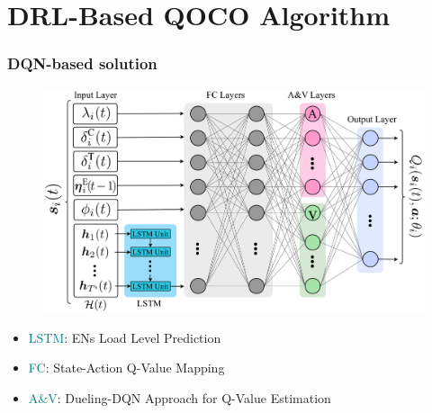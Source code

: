 \section{DRL-Based QOCO Algorithm}

\begin{frame}
	\frametitle{DQN-based solution}
	
	\begin{figure}
	\captionsetup{name=Fig.}
	\centering
	\includegraphics[width=0.85\linewidth]{DQN}
	\vspace*{-5mm}
	\vspace*{-3mm}
	\label{fig1}
\end{figure}
	
	\vspace{6mm}
	
	\begin{itemize}[]
	
	\item  \hspace{0mm}  \textcolor{teal}{LSTM}: ENs Load Level Prediction
	
	\item  \hspace{0mm}  \textcolor{teal}{FC}: State-Action Q-Value Mapping
	
	
	\item \hspace{0mm}  \textcolor{teal}{A\&V}: Dueling-DQN Approach for Q-Value Estimation
	
	
	
	
\end{itemize}

	
\end{frame}



